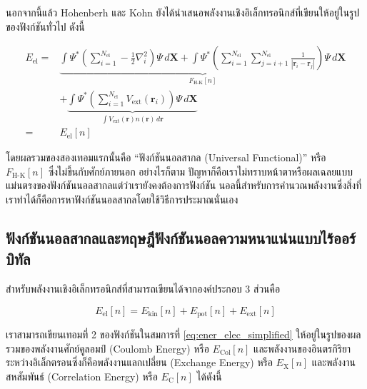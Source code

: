นอกจากนี้แล้ว Hohenberh และ Kohn ยังได้นำเสนอพลังงานเชิงอิเล็กทรอนิกส์ที่เขียนให้อยู่ในรูปของฟังก์ชันทั่วไป ดังนี้

\begin{align}\label{eq:ener_univer_ext_pot}
    E_{\text{el}} = & \underbrace{\int \Psi^{\ast}
        \left ( \sum^{N_{\text{el}}}_{i=1} -\frac{1}{2} \nabla^{2}_{i} \right )
        \Psi \, d\bm{X}
        + \int \Psi^{\ast}
        \left ( \sum^{N_{\text{el}}}_{i=1} \sum^{N_{\text{el}}}_{j=i+1} \frac{1}{|\bm{r}_{i}-\bm{r}_{j}|} \right )
    \Psi \, d\bm{X}}_{\textstyle F_{\text{H-K}}[n]} \nonumber       \\
                    & + \underbrace{\int \Psi^{\ast}
        \left ( \sum^{N_{\text{el}}}_{i=1} V_{\text{ext}}(\bm{r}_{i}) \right )
        \Psi \, d\bm{X}%
    }_{\textstyle \int V_{\text{ext}}(\bm{r}) n(\bm{r}) \, d\bm{r}} \\
    =               & E_{\text{el}}[n]
\end{align}

\noindent โดยผลรวมของสองเทอมแรกนั้นคือ \enquote{ฟังก์ชันนอลสากล (Universal Functional)} หรือ $F_{\text{H-K}}[n]$
ซึ่งไม่ขึ้นกับศักย์ภายนอก อย่างไรก็ตาม ปัญหาก็คือเราไม่ทราบหน้าตาหรือผลเฉลยแบบแม่นตรงของฟังก์ชันนอลสากลแต่ว่าเรายังคงต้องการฟังก์ชัน%
นอลนี้สำหรับการคำนวณพลังงานซึ่งสิ่งที่เราทำได้ก็คือการหาฟังก์ชันนอลสากลโดยใช้วิธีการประมาณนั่นเอง

\subsection{ฟังก์ชันนอลสากลและทฤษฎีฟังก์ชันนอลความหนาแน่นแบบไร้ออร์บิทัล}
\label{ssec:univer_functional}

สำหรับพลังงานเชิงอิเล็กทรอนิกส์ที่สามารถเขียนได้จากองค์ประกอบ 3 ส่วนคือ

\begin{equation}\label{eq:ener_elec_simplified}
    E_{\text{el}}[n] = E_{\text{kin}}[n] + E_{\text{pot}}[n] + E_{\text{ext}}[n]
\end{equation}

\noindent เราสามารถเขียนเทอมที่ 2 ของฟังก์ชันในสมการที่ \eqref{eq:ener_elec_simplified} ให้อยู่ในรูปของผลรวมของพลังงานศักย์คูลอมป์
(Coulomb Energy) หรือ $E_{\text{Col}}[n]$ และพลังงานของอินตรกิริยาระหว่างอิเล็กตรอนซึ่งก็คือพลังงานแลกเปลี่ยน (Exchange Energy)
หรือ $E_{\text{X}}[n]$ และพลังงานสหสัมพันธ์ (Correlation Energy) หรือ $E_{\text{C}}[n]$ ได้ดังนี้

